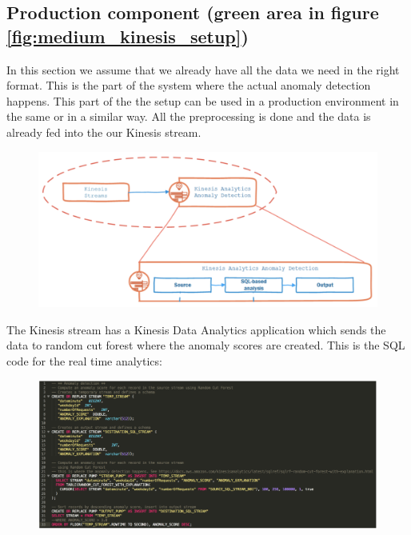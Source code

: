     \subsection{Production component (green area in figure \ref{fig:medium_kinesis_setup})}
    In this section we assume that we already have all the data we need in the right format. This is the part of the system where the actual anomaly detection happens. This part of the the setup can be used in a production environment in the same or in a similar way. All the preprocessing is done and the data is already fed into the our Kinesis stream.
    \begin{figure}
        \centering
        \includegraphics[width=1\textwidth]{images/kinesis-rcf.png}
        \label{fig:medium_kinesis_data_analytics_rcf}
    \end{figure}
    \FloatBarrier
    The Kinesis stream has a Kinesis Data Analytics application which sends the data to random cut forest where the anomaly scores are created. This is the SQL code for the real time analytics:
    \begin{figure}
        \centering
        \includegraphics[width=1\textwidth]{images/sql-analytics.png}
        \label{fig:medium_sql_analytics}
    \end{figure}
